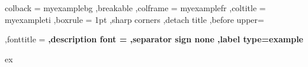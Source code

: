 
{%
	colback = myexamplebg
	,breakable
	,colframe = myexamplefr
	,coltitle = myexampleti
	,boxrule = 1pt
	,sharp corners
	,detach title
	,before upper=\tcbtitle\par\smallskip
	,fonttitle = \bfseries\sffamily
	,description font = \mdseries\sffamily
	,separator sign none
	,label type=example
}
{ex}



